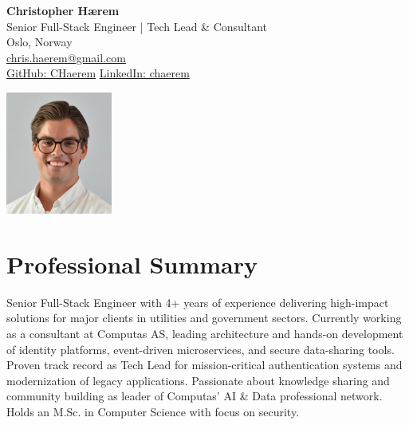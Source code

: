 \documentclass[11pt,a4paper]{article}
\begin{document}
\begin{minipage}[t]{0.7\textwidth}
\vspace{0pt}
{\Huge\bfseries Christopher H\ae rem}\\[5pt]
{\Large Senior Full-Stack Engineer | Tech Lead \& Consultant}\\[10pt]
Oslo, Norway\\
\href{mailto:chris.haerem@gmail.com}{chris.haerem@gmail.com}\\
\href{https://github.com/CHaerem}{GitHub: CHaerem} \quad
\href{https://linkedin.com/in/chaerem}{LinkedIn: chaerem}
\end{minipage}
\begin{minipage}[t]{0.3\textwidth}
\vspace{0pt}
\raggedleft
\includegraphics[width=3.5cm]{profile.jpeg}
\end{minipage}

\vspace{20pt}

\section{Professional Summary}
Senior Full-Stack Engineer with 4+ years of experience delivering high-impact solutions for major clients in utilities and government sectors. Currently working as a consultant at Computas AS, leading architecture and hands-on development of identity platforms, event-driven microservices, and secure data-sharing tools. Proven track record as Tech Lead for mission-critical authentication systems and modernization of legacy applications. Passionate about knowledge sharing and community building as leader of Computas' AI \& Data professional network. Holds an M.Sc. in Computer Science with focus on security.

\vspace{10pt}

\end{document}
